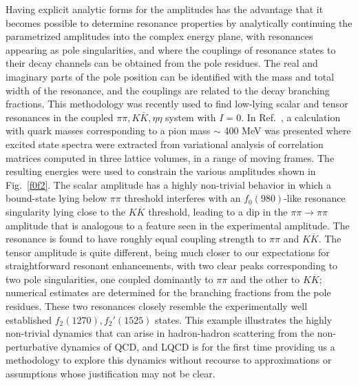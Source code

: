 Having explicit analytic forms for the amplitudes has the advantage that it becomes possible to determine resonance properties  by analytically continuing the parametrized amplitudes into the complex energy plane, with resonances appearing as pole singularities, and where the couplings of resonance states to their decay channels can be obtained from the pole residues. The real and imaginary parts of the pole position can be identified with the mass and total width of the resonance, and the couplings are related to the decay branching fractions.
%
This methodology was recently used to find low-lying scalar and tensor resonances in the coupled $\pi\pi, K\overline{K}, \eta\eta$ system with $I=0$. In Ref.~\cite{Briceno:2017qmb}, a calculation with quark masses corresponding to a pion mass $\sim$ 400 MeV was presented where excited state spectra were extracted from variational analysis of correlation matrices computed in three lattice volumes, in a range of moving frames. The resulting energies were used to constrain the various amplitudes shown in Fig.~\ref{f0f2}. The scalar amplitude has a highly non-trivial behavior in which a bound-state lying below $\pi\pi$ threshold interferes with an $f_0(980)$-like resonance singularity lying close to the $K\overline{K}$ threshold, leading to a {dip} in the $\pi\pi \to \pi \pi$ amplitude that is analogous to a feature seen in the experimental amplitude. The resonance is found to have roughly equal coupling strength to $\pi\pi$ and $K\overline{K}$. The tensor amplitude is quite different, being much closer to our expectations for straightforward resonant enhancements, with two clear peaks corresponding to two pole singularities, one coupled dominantly to $\pi\pi$ and the other to $K\overline{K}$; numerical estimates are determined for the branching fractions from the pole residues. These two resonances closely resemble the experimentally well established $f_2(1270), f_2'(1525)$ states.
%
This example illustrates the highly non-trivial dynamics that can arise in hadron-hadron scattering from the non-perturbative dynamics of QCD, and LQCD is for the first time providing us a methodology to explore this dynamics without recourse to approximations or assumptions whose justification may not be clear. 


